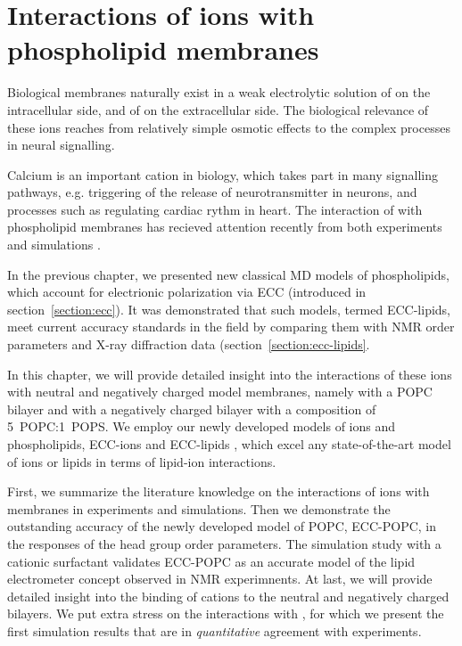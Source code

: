 \chapter{Interactions of ions with phospholipid membranes}
\label{chap:results}

Biological membranes naturally exist in a weak electrolytic solution of  on the intracellular side, and of  on the extracellular side. 
The biological relevance of these ions reaches from relatively simple osmotic effects to the complex processes in neural signalling. 

Calcium is an important cation in biology, 
which takes part in many signalling pathways, e.g. triggering of the release of neurotransmitter in neurons,
and processes such as regulating cardiac rythm in heart. 
The interaction of  with phospholipid membranes has recieved attention recently from both experiments and simulations \citep{melcrova16, javanainen17}.

In the previous chapter, we presented new classical MD models of phospholipids,
which account for electrionic polarization via ECC (introduced in section~\ref{section:ecc}). 
It was demonstrated that such models, termed ECC-lipids, 
meet current accuracy standards in the field 
by comparing them with NMR order parameters and X-ray diffraction data (section~\ref{section:ecc-lipids}. 

In this chapter, we will provide detailed insight into the interactions of these ions with neutral and negatively charged model membranes,
namely with a POPC bilayer and with a negatively charged bilayer with a composition of 5~POPC:1~POPS. 
We employ our newly developed models of ions and phospholipids, 
ECC-ions \citep{martinek17, kohagen16, Pluharova2014} and ECC-lipids \citep{melcr18}, 
which excel any state-of-the-art model of ions or lipids in terms of lipid-ion interactions. 

First, we summarize the literature knowledge on the interactions of ions with membranes in experiments and simulations.
Then we demonstrate the outstanding accuracy of the newly developed model of POPC, ECC-POPC, 
in the responses of the head group order parameters.
The simulation study with a cationic surfactant 
validates ECC-POPC as an accurate model of the lipid electrometer concept observed in NMR experimnents. 
At last, we will provide detailed insight into the binding of cations to the neutral and negatively charged bilayers. 
We put extra stress on the interactions with , 
for which we present the first simulation results that are in \emph{quantitative} agreement with experiments. \citep{catte16, melcr18}





